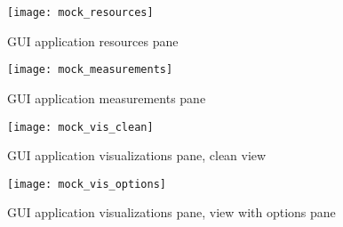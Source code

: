 \begin{figure}[h]
  \centering
  \texttt{[image: mock\_resources]}
  \caption{GUI application resources pane}
  \label{fig:arch_overall}
\end{figure}

\begin{figure}[h]
  \centering
  \texttt{[image: mock\_measurements]}
  \caption{GUI application measurements pane}
  \label{fig:arch_overall}
\end{figure}

\begin{figure}[h]
  \centering
  \texttt{[image: mock\_vis\_clean]}
  \caption{GUI application visualizations pane, clean view}
  \label{fig:arch_overall}
\end{figure}

\begin{figure}[h]
  \centering
  \texttt{[image: mock\_vis\_options]}
  \caption{GUI application visualizations pane, view with options pane}
  \label{fig:arch_overall}
\end{figure}

